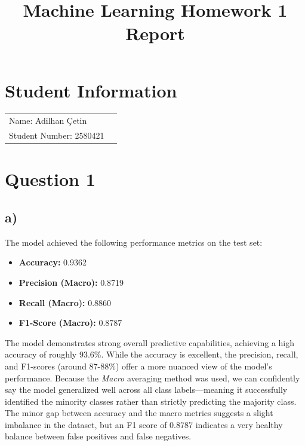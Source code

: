 \documentclass[12pt]{article}
\title{Machine Learning Homework 1 Report}
\author{}
\date{}
\begin{document}
\maketitle

\section*{Student Information}
\begin{tabular}{ll}
    Name: Adilhan Çetin&  \\
    Student Number: 2580421&
\end{tabular}

\vspace{1cm}

\section*{Question 1}

\subsection*{a)}
The model achieved the following performance metrics on the test set:
\begin{itemize}
    \item \textbf{Accuracy:} 0.9362
    \item \textbf{Precision (Macro):} 0.8719
    \item \textbf{Recall (Macro):} 0.8860
    \item \textbf{F1-Score (Macro):} 0.8787
\end{itemize}

The model demonstrates strong overall predictive capabilities, achieving a high accuracy of roughly 93.6\%. While the accuracy is excellent, the precision, recall, and F1-scores (around 87-88\%) offer a more nuanced view of the model's performance. Because the \textit{Macro} averaging method was used, we can confidently say the model generalized well across all class labels—meaning it successfully identified the minority classes rather than strictly predicting the majority class. The minor gap between accuracy and the macro metrics suggests a slight imbalance in the dataset, but an F1 score of 0.8787 indicates a very healthy balance between false positives and false negatives.
\end{document}
